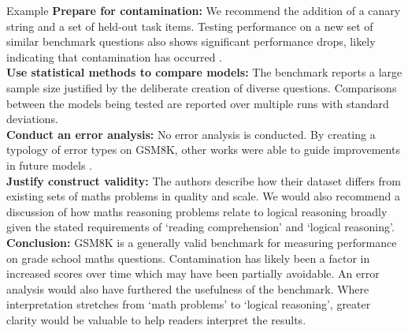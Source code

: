 \begin{examplebox}{Example}
\textbf{Prepare for contamination:} 
We recommend the addition of a canary string and a set of held-out task items. Testing performance on a new set of similar benchmark questions also shows significant performance drops, likely indicating that contamination has occurred \cite{zhang2024careful}.\\

\textbf{Use statistical methods to compare models:} 
The benchmark reports a large sample size justified by the deliberate creation of diverse questions. Comparisons between the models being tested are reported over multiple runs with standard deviations.\\

\textbf{Conduct an error analysis:} 
No error analysis is conducted. By creating a typology of error types on GSM8K, other works were able to guide improvements in future models \cite{wei2022chain, wang-etal-2023-plan}.\\

\textbf{Justify construct validity:} 
The authors describe how their dataset differs from existing sets of maths problems in quality and scale. We would also recommend a discussion of how maths reasoning problems relate to logical reasoning broadly given the stated requirements of `reading comprehension' and `logical reasoning'.\\

\textbf{Conclusion:}
GSM8K is a generally valid benchmark for measuring performance on grade school maths questions. Contamination has likely been a factor in increased scores over time which may have been partially avoidable. An error analysis would also have furthered the usefulness of the benchmark. Where interpretation stretches from `math problems' to `logical reasoning', greater clarity would be valuable to help readers interpret the results.

\end{examplebox}